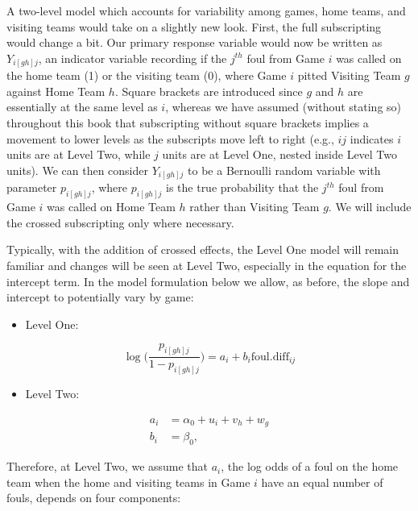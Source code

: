 \documentclass[
]{krantz}
\providecommand{\tightlist}{%
  \setlength{\itemsep}{0pt}\setlength{\parskip}{0pt}}
\begin{document}
A two-level model which accounts for variability among games, home teams, and visiting teams would take on a slightly new look. First, the full subscripting would change a bit. Our primary response variable would now be written as \(Y_{i[gh]j}\), an indicator variable recording if the \(j^{th}\) foul from Game \(i\) was called on the home team (1) or the visiting team (0), where Game \(i\) pitted Visiting Team \(g\) against Home Team \(h\). Square brackets are introduced since \(g\) and \(h\) are essentially at the same level as \(i\), whereas we have assumed (without stating so) throughout this book that subscripting without square brackets implies a movement to lower levels as the subscripts move left to right (e.g., \(ij\) indicates \(i\) units are at Level Two, while \(j\) units are at Level One, nested inside Level Two units). We can then consider \(Y_{i[gh]j}\) to be a Bernoulli random variable with parameter \(p_{i[gh]j}\), where \(p_{i[gh]j}\) is the true probability that the \(j^{th}\) foul from Game \(i\) was called on Home Team \(h\) rather than Visiting Team \(g\). We will include the crossed subscripting only where necessary.

Typically, with the addition of crossed effects, the Level One model will remain familiar and changes will be seen at Level Two, especially in the equation for the intercept term. In the model formulation below we allow, as before, the slope and intercept to potentially vary by game:

\begin{itemize}
\tightlist
\item
  Level One:
\end{itemize}

\begin{equation}
\log\bigg(\frac{p_{i[gh]j}}{1-p_{i[gh]j}}\bigg)=a_{i}+b_{i}\mathrm{foul.diff}_{ij}
\label{eq:lev1cross} 
\end{equation}

\begin{itemize}
\tightlist
\item
  Level Two:
\end{itemize}

\begin{align*}
a_{i} & = \alpha_{0}+u_{i}+v_{h}+w_{g} \\
b_{i} & = \beta_{0},
\end{align*}

Therefore, at Level Two, we assume that \(a_{i}\), the log odds of a foul on the home team when the home and visiting teams in Game \(i\) have an equal number of fouls, depends on four components:
\end{document}
